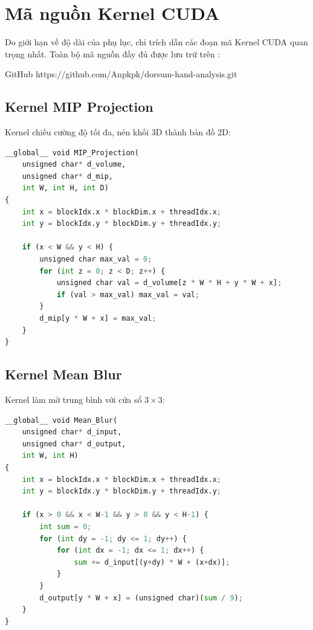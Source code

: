 
\chapter{Mã nguồn Kernel CUDA} %

\label{AppendixA} %


Do giới hạn về độ dài của phụ lục, chỉ trích dẫn các đoạn mã Kernel CUDA quan trọng nhất. Toàn bộ mã nguồn đầy đủ được lưu trữ trên :

GitHub https://github.com/Anpkpk/dorsum-hand-analysis.git

\section{Kernel MIP Projection}

Kernel chiếu cường độ tối đa, nén khối 3D thành bản đồ 2D:

\begin{lstlisting}[language=Python, caption={Object Detection Function}, label={lst:detect_function}]
__global__ void MIP_Projection(
    unsigned char* d_volume, 
    unsigned char* d_mip,
    int W, int H, int D) 
{
    int x = blockIdx.x * blockDim.x + threadIdx.x;
    int y = blockIdx.y * blockDim.y + threadIdx.y;
    
    if (x < W && y < H) {
        unsigned char max_val = 0;
        for (int z = 0; z < D; z++) {
            unsigned char val = d_volume[z * W * H + y * W + x];
            if (val > max_val) max_val = val;
        }
        d_mip[y * W + x] = max_val;
    }
}
\end{lstlisting}

\section{Kernel Mean Blur}

Kernel làm mờ trung bình với cửa sổ $3 \times 3$:

\begin{lstlisting}[language=Python, label={lst:detect_function}]
__global__ void Mean_Blur(
    unsigned char* d_input, 
    unsigned char* d_output,
    int W, int H) 
{
    int x = blockIdx.x * blockDim.x + threadIdx.x;
    int y = blockIdx.y * blockDim.y + threadIdx.y;
    
    if (x > 0 && x < W-1 && y > 0 && y < H-1) {
        int sum = 0;
        for (int dy = -1; dy <= 1; dy++) {
            for (int dx = -1; dx <= 1; dx++) {
                sum += d_input[(y+dy) * W + (x+dx)];
            }
        }
        d_output[y * W + x] = (unsigned char)(sum / 9);
    }
}
\end{lstlisting}

